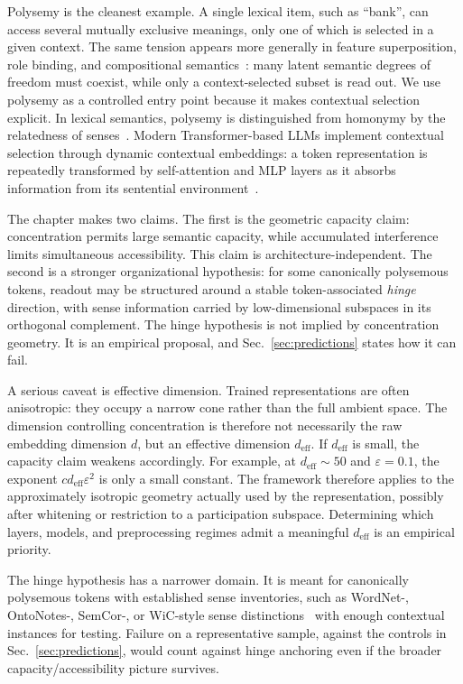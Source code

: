 \documentclass[
  aps,
  reprint,
  superscriptaddress,
  floatfix,
  nofootinbib,
  longbibliography
]{revtex4-2}
\newcommand{\deff}{d_{\mathrm{eff}}}
\begin{document}
Polysemy is the cleanest example. A single lexical item, such as
``bank'', can access several mutually exclusive meanings, only one of
which is selected in a given context. The same tension appears more
generally in feature superposition, role binding, and compositional
semantics~\cite{mikolov2013}: many latent semantic degrees of freedom
must coexist, while only a context-selected subset is read out. We use
polysemy as a controlled entry point because it makes contextual
selection explicit. In lexical semantics, polysemy is distinguished
from homonymy by the relatedness of senses~\cite{pustejovsky1995}.
Modern Transformer-based LLMs implement contextual selection through
dynamic contextual embeddings: a token representation is repeatedly
transformed by self-attention and MLP layers as it absorbs information
from its sentential environment~\cite{Vaswani-2017-Attention}.

The chapter makes two claims. The first is the geometric capacity claim:
concentration permits large semantic capacity, while accumulated
interference limits simultaneous accessibility. This claim is
architecture-independent. The second is a stronger organizational
hypothesis: for some canonically polysemous tokens, readout may be
structured around a stable token-associated \emph{hinge} direction,
with sense information carried by low-dimensional subspaces in its
orthogonal complement. The hinge hypothesis is not implied by
concentration geometry. It is an empirical proposal, and
Sec.~\ref{sec:predictions} states how it can fail.

A serious caveat is effective dimension. Trained representations are
often anisotropic: they occupy a narrow cone rather than the full
ambient space. The dimension controlling concentration is therefore
not necessarily the raw embedding dimension $d$, but an effective
dimension $\deff$. If $\deff$ is small, the capacity claim weakens
accordingly. For example, at $\deff\sim 50$ and $\varepsilon=0.1$, the
exponent $c\deff\varepsilon^{2}$ is only a small constant. The framework
therefore applies to the approximately isotropic geometry actually used
by the representation, possibly after whitening or restriction to a
participation subspace. Determining which layers, models, and
preprocessing regimes admit a meaningful $\deff$ is an empirical
priority.

The hinge hypothesis has a narrower domain. It is meant for
canonically polysemous tokens with established sense inventories, such
as WordNet-, OntoNotes-, SemCor-, or WiC-style sense
distinctions~\cite{pilehvar2019wic} with enough contextual instances
for testing. Failure on a representative sample, against the controls
in Sec.~\ref{sec:predictions}, would count against hinge anchoring even
if the broader capacity/accessibility picture survives.
\end{document}
